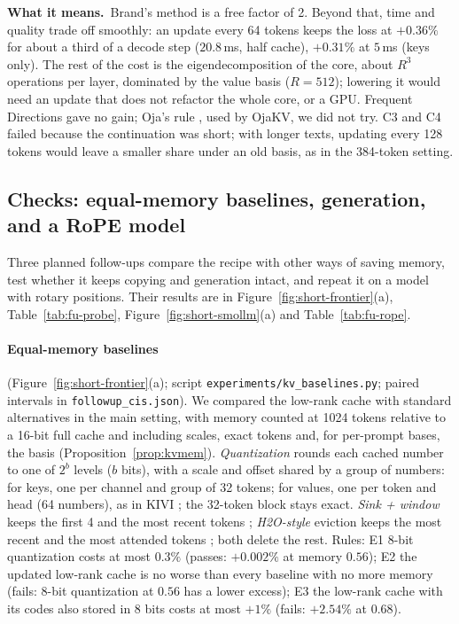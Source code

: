\documentclass[10pt]{article}
\theoremstyle{plain}
\theoremstyle{definition}
\theoremstyle{remark}
\newcommand{\means}{\noindent\textbf{What it means.}\ }
\newcommand{\rl}[1]{\textsf{#1}}%
\begin{document}
\means Brand's method is a free factor of 2. Beyond that, time and quality trade off smoothly: an update every 64 tokens keeps the loss at $+0.36\%$ for about a third of a decode step ($20.8$\,ms, half cache), $+0.31\%$ at $5$\,ms (keys only). The rest of the cost is the eigendecomposition of the core, about $R^3$ operations per layer, dominated by the value basis ($R=512$); lowering it would need an update that does not refactor the whole core, or a GPU. Frequent Directions gave no gain; Oja's rule \cite{oja1982}, used by OjaKV, we did not try. \rl{C3} and \rl{C4} failed because the continuation was short; with longer texts, updating every 128 tokens would leave a smaller share under an old basis, as in the 384-token setting.

\subsection{Checks: equal-memory baselines, generation, and a RoPE model}
\label{sec:kvchecks}

Three planned follow-ups compare the recipe with other ways of saving memory, test whether it keeps copying and generation intact, and repeat it on a model with rotary positions. Their results are in Figure~\ref{fig:short-frontier}(a), Table~\ref{tab:fu-probe}, Figure~\ref{fig:short-smollm}(a) and Table~\ref{tab:fu-rope}.

\paragraph{Equal-memory baselines} (Figure~\ref{fig:short-frontier}(a); script \texttt{experiments/kv\_baselines.py}; paired intervals in \texttt{followup\_cis.json}). We compared the low-rank cache with standard alternatives in the main setting, with memory counted at 1024 tokens relative to a 16-bit full cache and including scales, exact tokens and, for per-prompt bases, the basis (Proposition~\ref{prop:kvmem}). \emph{Quantization} rounds each cached number to one of $2^b$ levels ($b$ bits), with a scale and offset shared by a group of numbers: for keys, one per channel and group of 32 tokens; for values, one per token and head (64 numbers), as in KIVI \cite{liu2024kivi}; the 32-token block stays exact. \emph{Sink + window} keeps the first 4 and the most recent tokens \cite{xiao2024sinks}; \emph{H2O-style} eviction keeps the most recent and the most attended tokens \cite{zhang2023h2o}; both delete the rest. Rules: \rl{E1} 8-bit quantization costs at most $0.3\%$ (passes: $+0.002\%$ at memory $0.56$); \rl{E2} the updated low-rank cache is no worse than every baseline with no more memory (fails: 8-bit quantization at $0.56$ has a lower excess); \rl{E3} the low-rank cache with its codes also stored in 8 bits costs at most $+1\%$ (fails: $+2.54\%$ at $0.68$).
\end{document}
